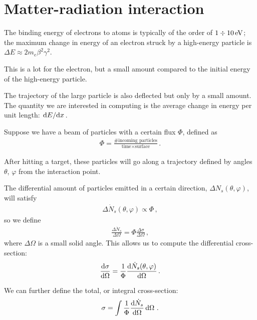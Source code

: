 \documentclass[main.tex]{subfiles}
\begin{document}
\section{Matter-radiation interaction}


The binding energy of electrons to atoms 
is typically of the order of \(1 \divisionsymbol \SI{10}{eV}\); 
the maximum change in energy of an electron struck by a high-energy particle is \(\Delta E \approx 2 m_e \beta^2 \gamma^2\). 

This is a lot for the electron, but a small amount compared to the initial energy of the high-energy particle. 

The trajectory of the large particle is also deflected but only by a small amount. 
The quantity we are interested in computing is the average change in energy per unit length: \(\dv*{E}{x}\). 

Suppose we have a beam of particles with a certain flux \(\Phi \), defined as 
%
\begin{align}
\Phi = \frac{\text{\# incoming particles}}{\text{time} \times \text{surface}}
\,.
\end{align}

After hitting a target, these particles will go along a trajectory defined by angles \(\theta \), \(\varphi \) from the interaction point. 

The differential amount of particles emitted in a certain direction, \(\Delta N_s (\theta , \varphi )\), will satisfy 
%
\begin{align}
\Delta \dot{N}_s (\theta , \varphi ) \propto \Phi 
\,,
\end{align}
%
so we define 
%
\begin{align}
\frac{\Delta \dot{N}_s}{\Delta \Omega } = \Phi \frac{\Delta \sigma }{\Delta \Omega }
\,,
\end{align}
%
where \(\Delta \Omega \) is a small solid angle. 
This allows us to compute the differential cross-section: 
%
\begin{align}
\dv{\sigma }{\Omega } =  \frac{1}{\Phi } \dv{\dot{N}_s(\theta , \varphi )}{\Omega }
\,.
\end{align}

We can further define the total, or integral cross-section: 
%
\begin{align}
\sigma = \int \frac{1}{\Phi } \dv{\dot{N}_s}{\Omega } \dd{\Omega }
\,.
\end{align}
\end{document}
